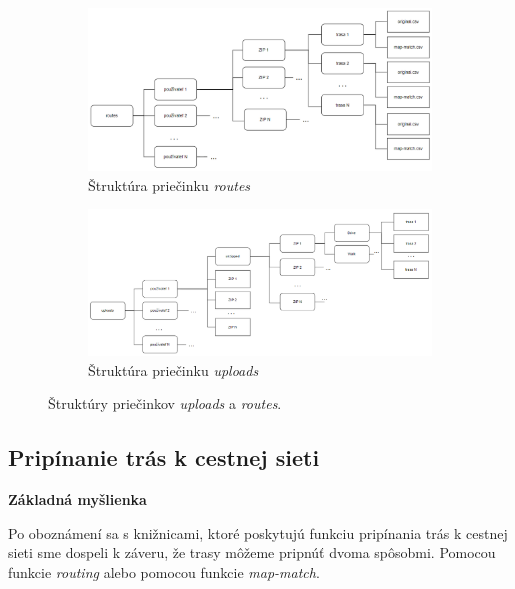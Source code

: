 \begin{figure}[H]
    \centering
    \begin{subfigure}{\textwidth}
        \centering
        \includegraphics[width=1\textwidth]{img/struktura priecinkov/routes.png}
        \caption{Štruktúra priečinku \textit{routes}}
        \label{fig:routes-structure}
    \end{subfigure}
    \begin{subfigure}{\textwidth}
        \centering
        \includegraphics[width=1\textwidth]{img/struktura priecinkov/uploads.png}
        \caption{Štruktúra priečinku \textit{uploads}}
        \label{fig:uploads-structure}
    \end{subfigure}
    \caption{Štruktúry priečinkov \textit{uploads} a \textit{routes}.}
    \label{fig:uploads-routes-structure}
\end{figure}


\subsection{Pripínanie trás k cestnej sieti}
\textbf{Základná myšlienka}

Po oboznámení sa s knižnicami, ktoré poskytujú funkciu pripínania trás k cestnej sieti sme dospeli k záveru, že trasy môžeme pripnúť dvoma spôsobmi. Pomocou funkcie \textit{routing} alebo pomocou funkcie \textit{map-match}. 

